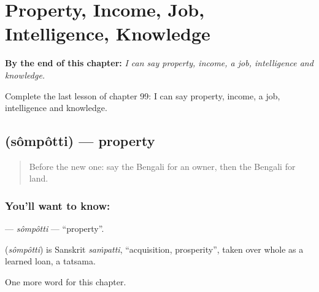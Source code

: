
\chapter{Property, Income, Job, Intelligence, Knowledge}
\label{ch:bn-property-income-job-intelligence-knowledge}

\begin{chapteropening}
\textbf{By the end of this chapter:} \emph{I can say property, income, a job, intelligence and knowledge.}

Complete the last lesson of chapter 99: I can say property, income, a job, intelligence and knowledge.
\end{chapteropening}

\section[\texorpdfstring{\bn{সম্পত্তি} (sômpôtti)}{সম্পত্তি (sômpôtti)}]{ (sômpôtti) — property}

\label{lesson:BN-C99-sompotti}



\begin{quote}
Before the new one: say the Bengali for an owner, then the Bengali for land.
\end{quote}

\subsection*{You'll want to know: }
\textbf{} — \emph{sômpôtti} — \textquotedblleft{}property\textquotedblright{}.

\begin{cousinweb}
\textbf{} (\emph{sômpôtti}) is Sanskrit \emph{saṁpatti}, \textquotedblleft{}acquisition, prosperity\textquotedblright{}, taken over whole as a learned loan, a tatsama.
\end{cousinweb}

\begin{grammarlens}[title={What you've built}]
One more word for this chapter.
\end{grammarlens}

